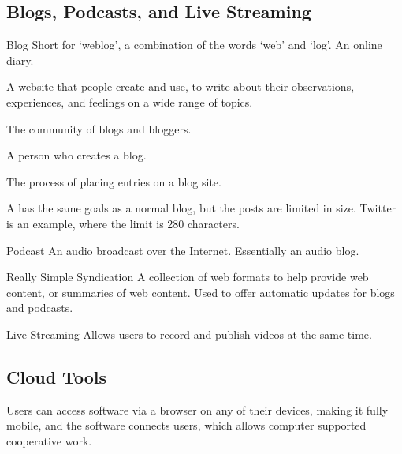 \documentclass[\main/notes.tex]{subfiles}
\begin{document}
			\subsection{Blogs, Podcasts, and Live Streaming}
				\begin{definition}{Blog}
					Short for `weblog', a combination of the words `web' and `log'. An online diary.

					A website that people create and use, to write about their observations, experiences, and feelings on a wide range of topics.
					\begin{description}[nosep]
						\item[Blogosphere] The community of blogs and bloggers.
						\item[Blogger] A person who creates a blog.
						\item[Blogging] The process of placing entries on a blog site.
					\end{description}

					A  has the same goals as a normal blog, but the posts are limited in size. Twitter is an example, where the limit is 280 characters.
				\end{definition}
				\begin{definition}{Podcast}
					An audio broadcast over the Internet. Essentially an audio blog.
				\end{definition}
				\begin{definition}{Really Simple Syndication}
					A collection of web formats to help provide web content, or summaries of web content. Used to offer automatic updates for blogs and podcasts.
				\end{definition}
				\begin{definition}{Live Streaming}
					Allows users to record and publish videos at the same time.
				\end{definition}
			\subsection{Cloud Tools}
				Users can access software via a browser on any of their devices, making it fully mobile, and the software connects users, which allows computer supported cooperative work.

	\vbox{}
\end{document}
